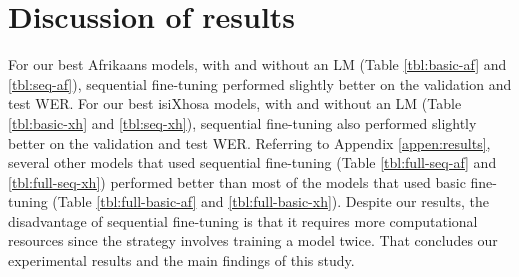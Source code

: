 \section{Discussion of results}
For our best Afrikaans models, with and without an LM (Table \ref{tbl:basic-af} and \ref{tbl:seq-af}), sequential fine-tuning performed slightly better on the validation and test WER.
For our best isiXhosa models, with and without an LM (Table \ref{tbl:basic-xh} and \ref{tbl:seq-xh}), sequential fine-tuning also performed slightly better on the validation and test WER.
Referring to Appendix \ref{appen:results}, several other models that used sequential fine-tuning (Table \ref{tbl:full-seq-af} and \ref{tbl:full-seq-xh}) 
performed better than most of the models that used basic fine-tuning (Table \ref{tbl:full-basic-af} and \ref{tbl:full-basic-xh}).
Despite our results, the disadvantage of sequential fine-tuning is that it requires more computational resources since the strategy involves training a model twice.
That concludes our experimental results and the main findings of this study.